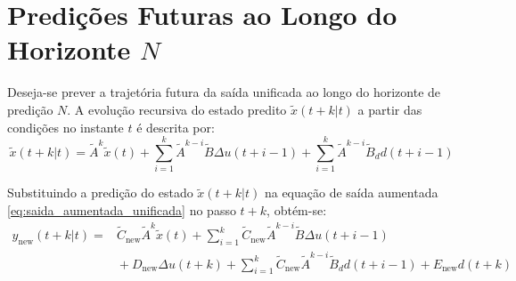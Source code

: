 \documentclass[12pt]{article}
\begin{document}
\section{Predições Futuras ao Longo do Horizonte $N$}

Deseja-se prever a trajetória futura da saída unificada ao longo do horizonte de predição $N$. A evolução recursiva do estado predito $\tilde{x}(t+k|t)$ a partir das condições no instante $t$ é descrita por:
\begin{equation}
\tilde{x}(t+k|t) = \tilde{A}^k \tilde{x}(t) + \sum_{i=1}^k \tilde{A}^{k-i} \tilde{B} \Delta u(t+i-1) + \sum_{i=1}^k \tilde{A}^{k-i} \tilde{B}_d d(t+i-1)
\end{equation}

Substituindo a predição do estado $\tilde{x}(t+k|t)$ na equação de saída aumentada \eqref{eq:saida_aumentada_unificada} no passo $t+k$, obtém-se:
\begin{align}
\label{eq:predicao_passo_k}
y_{\text{new}}(t+k|t) ={}& \tilde{C}_{\text{new}} \tilde{A}^k \tilde{x}(t) + \sum_{i=1}^k \tilde{C}_{\text{new}} \tilde{A}^{k-i} \tilde{B} \Delta u(t+i-1) \nonumber \\
&{}+ D_{\text{new}} \Delta u(t+k) + \sum_{i=1}^k \tilde{C}_{\text{new}} \tilde{A}^{k-i} \tilde{B}_d d(t+i-1) + E_{\text{new}} d(t+k)
\end{align}
\end{document}
